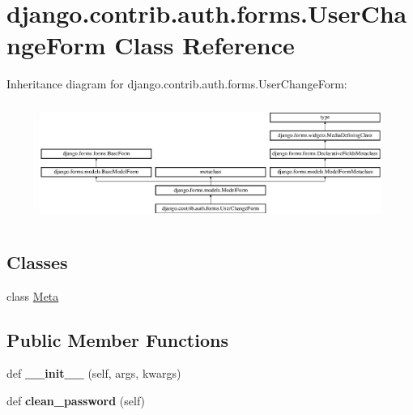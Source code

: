 \hypertarget{classdjango_1_1contrib_1_1auth_1_1forms_1_1_user_change_form}{}\section{django.\+contrib.\+auth.\+forms.\+User\+Change\+Form Class Reference}
\label{classdjango_1_1contrib_1_1auth_1_1forms_1_1_user_change_form}
Inheritance diagram for django.\+contrib.\+auth.\+forms.\+User\+Change\+Form\+:\begin{figure}[H]
\begin{center}
\leavevmode
\includegraphics[height=3.888889cm]{classdjango_1_1contrib_1_1auth_1_1forms_1_1_user_change_form}
\end{center}
\end{figure}
\subsection*{Classes}
\begin{DoxyCompactItemize}
\item 
class \mbox{\hyperlink{classdjango_1_1contrib_1_1auth_1_1forms_1_1_user_change_form_1_1_meta}{Meta}}
\end{DoxyCompactItemize}
\subsection*{Public Member Functions}
\begin{DoxyCompactItemize}
\item 
\mbox{\label{classdjango_1_1contrib_1_1auth_1_1forms_1_1_user_change_form_afb712b997eff1964966eaf94a211df0f}} 
def {\bfseries \+\_\+\+\_\+init\+\_\+\+\_\+} (self, args, kwargs)
\item 
\mbox{\label{classdjango_1_1contrib_1_1auth_1_1forms_1_1_user_change_form_a44856d011c0709579e72a27012e3c2c4}} 
def {\bfseries clean\+\_\+password} (self)
\end{DoxyCompactItemize}
